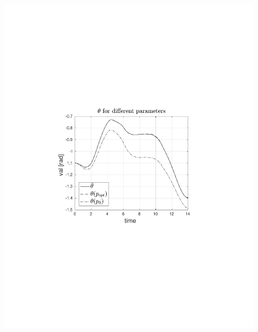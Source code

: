 \begin{frame}
\begin{columns}[t]
\begin{figure}
                \includegraphics[trim=4cm 9cm 4cm 8.5cm, clip=true, width=\linewidth]{img/convPlotTrajT}
            \end{figure}
    \end{columns}
\end{frame}
